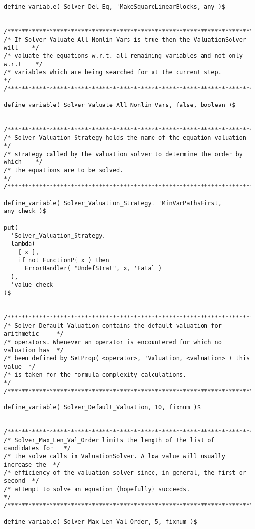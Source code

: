\begin{verbatim}
define_variable( Solver_Del_Eq, 'MakeSquareLinearBlocks, any )$


/******************************************************************************/
/* If Solver_Valuate_All_Nonlin_Vars is true then the ValuationSolver will    */
/* valuate the equations w.r.t. all remaining variables and not only w.r.t    */
/* variables which are being searched for at the current step.                */
/******************************************************************************/

define_variable( Solver_Valuate_All_Nonlin_Vars, false, boolean )$


/******************************************************************************/
/* Solver_Valuation_Strategy holds the name of the equation valuation         */
/* strategy called by the valuation solver to determine the order by which    */
/* the equations are to be solved.                                            */
/******************************************************************************/

define_variable( Solver_Valuation_Strategy, 'MinVarPathsFirst, any_check )$

put(
  'Solver_Valuation_Strategy,
  lambda(
    [ x ],
    if not FunctionP( x ) then
      ErrorHandler( "UndefStrat", x, 'Fatal )
  ),
  'value_check
)$


/******************************************************************************/
/* Solver_Default_Valuation contains the default valuation for arithmetic     */
/* operators. Whenever an operator is encountered for which no valuation has  */
/* been defined by SetProp( <operator>, 'Valuation, <valuation> ) this value  */
/* is taken for the formula complexity calculations.                          */
/******************************************************************************/

define_variable( Solver_Default_Valuation, 10, fixnum )$


/******************************************************************************/
/* Solver_Max_Len_Val_Order limits the length of the list of candidates for   */
/* the solve calls in ValuationSolver. A low value will usually increase the  */
/* efficiency of the valuation solver since, in general, the first or second  */
/* attempt to solve an equation (hopefully) succeeds.                         */
/******************************************************************************/

define_variable( Solver_Max_Len_Val_Order, 5, fixnum )$



\end{verbatim}
